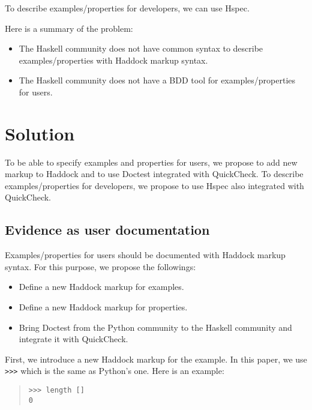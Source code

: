 \documentclass[preprint]{sigplanconf}
\newcommand{\hspec}{Hspec}
\newcommand{\doctest}{Doctest}
\begin{document}
To describe examples/properties for developers, we can use \hspec{}.

Here is a summary of the problem:

\begin{itemize}
\item The Haskell community does not have common syntax to describe
examples/properties with Haddock markup syntax.
\item The Haskell community does not have a BDD tool for examples/properties
    for users.
\end{itemize}

\section{Solution}

To be able to specify examples and properties for users, we propose to add new
markup to Haddock and to use \doctest{} integrated with QuickCheck. To
describe examples/properties for developers, we propose to use \hspec{} also
integrated with QuickCheck.

\subsection{Evidence as user documentation}
\label{sec:for-users}

Examples/properties for users should be documented with Haddock markup syntax.
For this purpose, we propose the followings:

\begin{itemize}
\item Define a new Haddock markup for examples.
\item Define a new Haddock markup for properties.
\item Bring \doctest{} from the Python community to the Haskell
community and integrate it with QuickCheck.
\end{itemize}

First, we introduce a new Haddock markup for the example.
In this paper, we use {\tt >>>} which is the same as Python's one.
Here is an example:

\begin{quote}
\small
\begin{verbatim}
>>> length []
0
\end{verbatim}
\end{quote}
\end{document}
